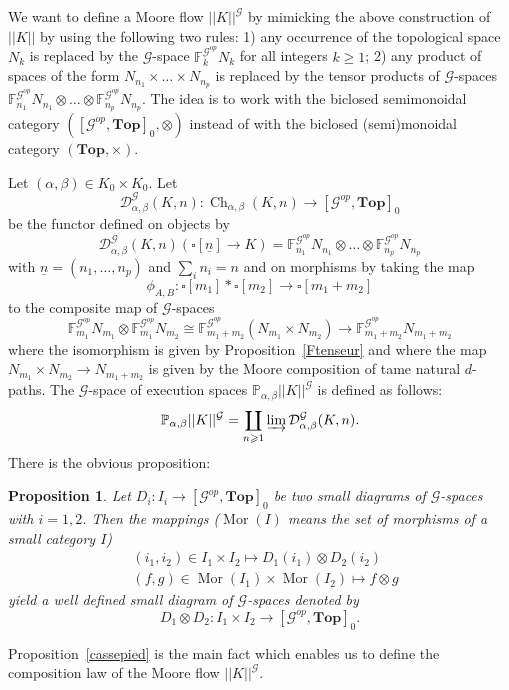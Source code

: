 \documentclass[a4paper,12pt]{amsart}
\newcommand{\D}{\mathcal{D}}
\newcommand{\p}{\times}
\renewcommand{\P}{\mathbb{P}}
\newtheorem{prop}[thm]{Proposition}
\newcommand{\bp}{\begin{prop}}
\newcommand{\ep}{\end{prop}}
\theoremstyle{definition}
\renewcommand{\top}{{\mathbf{Top}}}
\newcommand{\iso}{\cong}
\newcommand{\ot}{\otimes}
\renewcommand{\geq}{\geqslant}
\newcommand{\topdgr}{[\mathcal{G}^{op},\top]}
\DeclareMathOperator{\Mor}{Mor}
\DeclareMathOperator{\Ch}{Ch}
\newcommand{\liminj}{\varinjlim}
\renewcommand{\P}{\mathbb{P}}
\begin{document}
We want to define a Moore flow $||K||^{\mathcal{G}}$ by mimicking the above construction of $||K||$ by using the following two rules: 1) any occurrence of the topological space $N_k$ is replaced by the $\mathcal{G}$-space $\mathbb{F}^{\mathcal{G}^{op}}_k N_k$ for all integers $k\geq 1$; 2) any product of spaces of the form $N_{n_1}\p\dots \p N_{n_p}$ is replaced by the tensor products of $\mathcal{G}$-spaces  $\mathbb{F}^{\mathcal{G}^{op}}_{n_1}N_{n_1}\ot\dots \ot \mathbb{F}^{\mathcal{G}^{op}}_{n_p}N_{n_p}$. The idea is to work with the biclosed semimonoidal category $(\topdgr_0,\ot)$ instead of with the biclosed (semi)monoidal category $(\top,\p)$.

Let $(\alpha,\beta)\in K_0\p K_0$. Let \[\D_{\alpha,\beta}^{\mathcal{G}}(K,n):\Ch_{\alpha,\beta}(K,n)\longrightarrow \topdgr_0\] be the functor defined on objects by \[\D_{\alpha,\beta}^{\mathcal{G}}(K,n)(\square[\underline{n}]\to K) = \mathbb{F}^{\mathcal{G}^{op}}_{n_1} N_{n_1} \ot \dots \ot \mathbb{F}^{\mathcal{G}^{op}}_{n_p} N_{n_p}\] with $\underline{n} = (n_1,\dots,n_p)$ and $\sum_i n_i=n$ and on morphisms by taking the map \[\phi_{A,B}:\square[m_1]*\square[m_2] \to \square[m_1+m_2]\] to the composite map of $\mathcal{G}$-spaces \[\mathbb{F}^{\mathcal{G}^{op}}_{m_1} N_{m_1}\ot \mathbb{F}^{\mathcal{G}^{op}}_{m_1} N_{m_2} \iso \mathbb{F}^{\mathcal{G}^{op}}_{m_1+m_2} (N_{m_1}\p N_{m_2}) \to \mathbb{F}^{\mathcal{G}^{op}}_{m_1+m_2} N_{m_1+m_2}\] where the isomorphism is given by Proposition~\ref{Ftenseur} and where the map $N_{m_1}\p N_{m_2} \to N_{m_1+m_2}$ is given by the Moore composition of tame natural $d$-paths. The $\mathcal{G}$-space of execution spaces $\P_{\alpha,\beta} ||K||^{\mathcal{G}}$ is defined as follows:
\[
\P_{\alpha,\beta} ||K||^{\mathcal{G}} = \displaystyle\coprod_{n\geq 1} \liminj \D_{\alpha,\beta}^{\mathcal{G}}(K,n).
\]
There is the obvious proposition: 
\bp
Let $D_i:I_i\to \topdgr_0$ be two small diagrams of $\mathcal{G}$-spaces with $i=1,2$. Then the mappings ($\Mor(I)$ means the set of morphisms of a small category $I$)
\begin{align*}
	& (i_1,i_2)\in I_1\p I_2 \mapsto D_1(i_1)\ot D_2(i_2)\\
	& (f,g)\in \Mor(I_1)\p \Mor(I_2)\mapsto f\ot g
\end{align*} yield a well defined small diagram of $\mathcal{G}$-spaces denoted by \[D_1\ot D_2:I_1\p I_2 \longrightarrow \topdgr_0.\] 
\ep
 

Proposition~\ref{cassepied} is the main fact which enables us to define the composition law of the Moore flow $||K||^{\mathcal{G}}$.
\end{document}
